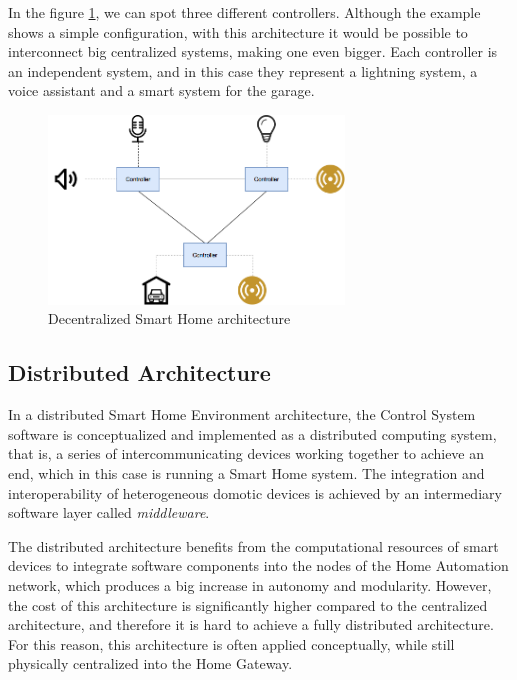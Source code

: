 In the figure \ref{fig:decentralized-sh-architecture}, we can spot three different controllers. Although the example shows a simple
configuration, with this architecture it would be possible to interconnect big centralized systems, making one even bigger. Each
controller is an independent system, and in this case they represent a lightning system, a voice assistant and a smart system for
the garage.

\begin{figure}
	\centering
	\includegraphics[width=0.7\textwidth]{images/Chapter_02/decentralized-sh-architecture.png}
	\caption{Decentralized Smart Home architecture}
	\label{fig:decentralized-sh-architecture}
\end{figure}

\subsection{Distributed Architecture}
In a distributed Smart Home Environment architecture, the Control System software is conceptualized and implemented as a 
distributed computing system, that is, a series of intercommunicating devices working together to achieve an end, which in this 
case is running a Smart Home system. The integration and interoperability of heterogeneous domotic devices is achieved by an
intermediary software layer called \textit{middleware}.\cite{badica13}

The distributed architecture benefits from the computational resources of smart devices to integrate software components into the 
nodes of the Home Automation network, which produces a big increase in autonomy and modularity\cite{raulCarreteroElegir}. 
However, the cost of this architecture is significantly higher compared to the centralized architecture, and therefore it is hard to achieve 
a fully distributed architecture. For this reason, this architecture is often applied conceptually, while still physically centralized into
the Home Gateway.

